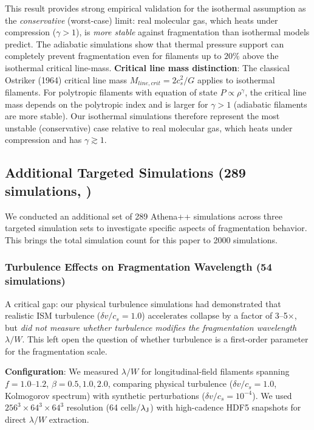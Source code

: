 \documentclass[twoside,twocolumn]{mnras}
\begin{document}
This result provides strong empirical validation for the isothermal assumption as the {\it conservative} (worst-case) limit: real molecular gas, which heats under compression ($\gamma > 1$), is {\it more stable} against fragmentation than isothermal models predict. The adiabatic simulations show that thermal pressure support can completely prevent fragmentation even for filaments up to $20\%$ above the isothermal critical line-mass. \textbf{Critical line mass distinction}: The classical Ostriker (1964) critical line mass $M_{line,crit} = 2c_s^2/G$ applies to isothermal filaments. For polytropic filaments with equation of state $P \propto \rho^\gamma$, the critical line mass depends on the polytropic index and is larger for $\gamma > 1$ (adiabatic filaments are more stable). Our isothermal simulations therefore represent the most unstable (conservative) case relative to real molecular gas, which heats under compression and has $\gamma \gtrsim 1$.

\subsection{Additional Targeted Simulations (289 simulations, )}
\label{sec:addsim}

We conducted an additional set of 289 Athena++ simulations across three targeted simulation sets to investigate specific aspects of fragmentation behavior. This brings the total simulation count for this paper to 2000 simulations.

\subsubsection{Turbulence Effects on Fragmentation Wavelength (54 simulations)}

A critical gap: our physical turbulence simulations had demonstrated that realistic ISM turbulence ($\delta v/c_s = 1.0$) accelerates collapse by a factor of 3--5$\times$, but \textit{did not measure whether turbulence modifies the fragmentation wavelength $\lambda/W$}. This left open the question of whether turbulence is a first-order parameter for the fragmentation scale.

\textbf{Configuration}: We measured $\lambda/W$ for longitudinal-field filaments spanning $f = 1.0$--$1.2$, $\beta = 0.5, 1.0, 2.0$, comparing physical turbulence ($\delta v/c_s = 1.0$, Kolmogorov spectrum) with synthetic perturbations ($\delta v/c_s = 10^{-4}$). We used $256^3 \times 64^3 \times 64^3$ resolution (64 cells/$\lambda_{\rm J}$) with high-cadence HDF5 snapshots for direct $\lambda/W$ extraction.
\end{document}
